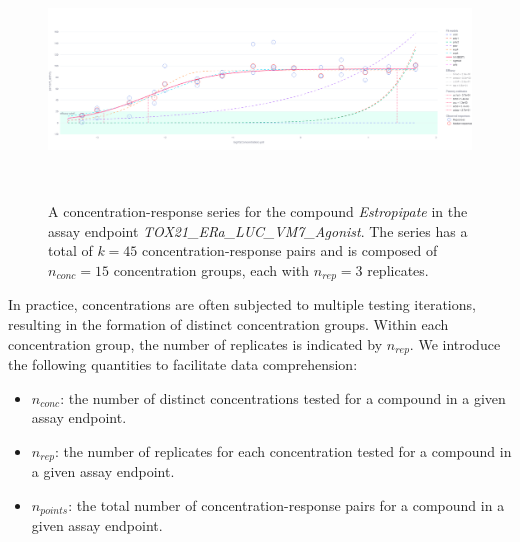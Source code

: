 \begin{figure}[htbp]  %
    \centering
    \includegraphics[width=1.0\textwidth]{figures/concentration_response_series_2.png}  
    \caption{A concentration-response series for the compound \textit{Estropipate} in the assay endpoint \textit{TOX21\_ERa\_LUC\_VM7\_Agonist}. The series has a total of $k = 45$ concentration-response pairs and is composed of $n_{conc} = 15$ concentration groups, each with $n_{rep} = 3$ replicates.}
~\label{fig:concentration_response_series} 
\end{figure}

In practice, concentrations are often subjected to multiple testing iterations, resulting in the formation of distinct concentration groups. Within each concentration group, the number of replicates is indicated by $n_{rep}$.
We introduce the following quantities to facilitate data comprehension:
\begin{itemize}
    \item $n_{conc}$: the number of distinct concentrations tested for a compound in a given assay endpoint.
    \item $n_{rep}$: the number of replicates for each concentration tested for a compound in a given assay endpoint.
    \item $n_{points}$: the total number of concentration-response pairs for a compound in a given assay endpoint.
\end{itemize}


